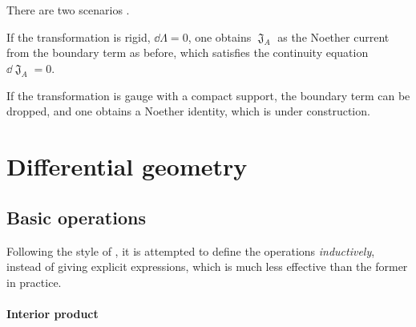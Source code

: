 \documentclass[a4paper]{article}
\begin{document}
There are two scenarios \cite{Avery2015}.

If the transformation is rigid, $\dd \Lambda = 0$, one obtains $\mfrakJ_A$ as 
the Noether current from the boundary term as before, which satisfies the 
continuity equation $\dd \mfrakJ_A = 0$.

If the transformation is gauge with a compact support, the boundary term can be
dropped, and one obtains a Noether identity, which is under construction.




\cite{Avery2015}


\appendix

\section{Differential geometry}


\subsection{Basic operations}

Following the style of \cite{Burke1985}, it is attempted to define 
the operations \emph{inductively}, instead of giving explicit expressions, 
which is much less effective than the former in practice.

\paragraph{Interior product}
\end{document}

